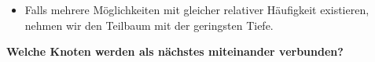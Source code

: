 \begin{itemize}
\begin{figure}[H]
			\caption{Erster Schritt im Huffmann-Kodierungs-Algorithmus}
		\end{figure}
		\item Falls mehrere Möglichkeiten mit gleicher relativer Häufigkeit existieren, nehmen wir den Teilbaum mit der geringsten Tiefe.
		\end{itemize}
\textbf{Welche Knoten werden als nächstes miteinander verbunden?}


